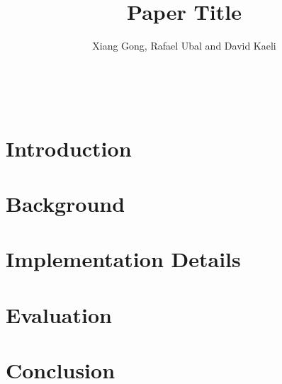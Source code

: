 \documentclass{sig-alternate}
\begin{document}
\title{Paper Title}
\author{
\alignauthor Xiang Gong, Rafael Ubal and David Kaeli\\
      \\
      \\
      \\
}
\maketitle

\section{Introduction}

\section{Background}

\section{Implementation Details}

\section{Evaluation}

\section{Conclusion}



\end{document}

